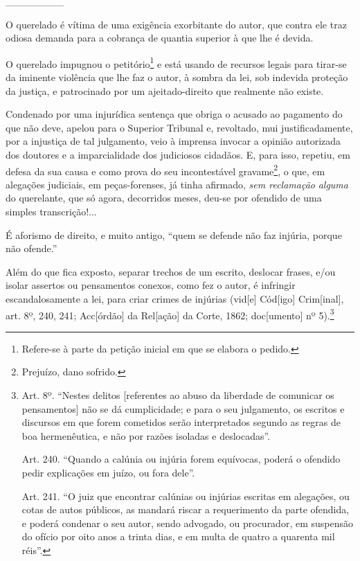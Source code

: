 \_\_\_\_\_\_\_\_

O querelado é vítima de uma exigência exorbitante do autor, que contra
ele traz odiosa demanda para a cobrança de quantia superior à que lhe é
devida.

O querelado impugnou o petitório\footnote{Refere-se à parte da petição
  inicial em que se elabora o pedido.} e está usando de recursos legais
para tirar-se da iminente violência que lhe faz o autor, à sombra da
lei, sob indevida proteção da justiça, e patrocinado por um
ajeitado-direito que realmente não existe.

Condenado por uma injurídica sentença que obriga o acusado ao pagamento
do que não deve, apelou para o Superior Tribunal e, revoltado, mui
justificadamente, por a injustiça de tal julgamento, veio à imprensa
invocar a opinião autorizada dos doutores e a imparcialidade dos
judiciosos cidadãos. E, para isso, repetiu, em defesa da sua causa e
como prova do seu incontestável gravame\footnote{Prejuízo, dano sofrido.},
o que, em alegações judiciais, em peças-forenses, já tinha afirmado,
\emph{sem reclamação} \emph{alguma} do querelante, que só agora,
decorridos meses, deu-se por ofendido de uma simples transcrição!...

É aforismo de direito, e muito antigo, ``quem se defende não faz
injúria, porque não ofende.''

Além do que fica exposto, separar trechos de um escrito, deslocar
frases, e/ou isolar assertos ou pensamentos conexos, como fez o autor, é
infringir escandalosamente a lei, para criar crimes de injúrias
(vid{[}e{]} Cód{[}igo{]} Crim{[}inal{]}, art. 8º, 240, 241;
Acc{[}órdão{]} da Rel{[}ação{]} da Corte, 1862; doc{[}umento{]} nº
5).\footnote{Art. 8º. ``Nestes delitos {[}referentes ao abuso da
  liberdade de comunicar os pensamentos{]} não se dá cumplicidade; e
  para o seu julgamento, os escritos e discursos em que forem cometidos
  serão interpretados segundo as regras de boa hermenêutica, e não por
  razões isoladas e deslocadas''.

  Art. 240. ``Quando a calúnia ou injúria forem equívocas, poderá o
  ofendido pedir explicações em juízo, ou fora dele''.

  Art. 241. ``O juiz que encontrar calúnias ou injúrias escritas em
  alegações, ou cotas de autos públicos, as mandará riscar a
  requerimento da parte ofendida, e poderá condenar o seu autor, sendo
  advogado, ou procurador, em suspensão do ofício por oito anos a trinta
  dias, e em multa de quatro a quarenta mil réis''.}

